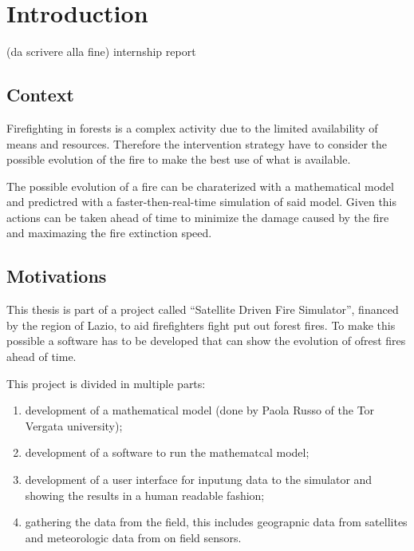 \documentclass{article}
\begin{document}

\section{Introduction}\label{sec:intro}

(da scrivere alla fine) internship report

\subsection{Context}\label{sec:context}

Firefighting in forests is a complex activity due to the limited availability of
means and resources. Therefore the intervention strategy have to consider the
possible evolution of the fire to make the best use of what is available.

The possible evolution of a fire can be charaterized with a mathematical model
and predictred with a faster-then-real-time simulation of said model. Given this
actions can be taken ahead of time to minimize the damage caused by the fire and
maximazing the fire extinction speed.

\subsection{Motivations}\label{sec:motivations}

This thesis is part of a project called ``Satellite Driven Fire Simulator'',
financed by the region of Lazio, to aid firefighters fight put out forest fires.
To make this possible a software has to be developed that can show the evolution
of ofrest fires ahead of time.

This project is divided in multiple parts:

\begin{enumerate}
\item development of a mathematical model (done by Paola Russo of the Tor
Vergata university);
\item \label{enum:my_work} development of a software to run the mathematcal
model;
\item \label{enum:interaction} development of a user interface for inputung data
to the simulator and showing the results in a human readable fashion;
\item \label{enum:data} gathering the data from the field, this includes geograpnic data from
satellites \cite{cop} and meteorologic data from on field sensors.
\end{enumerate}
\end{document}
